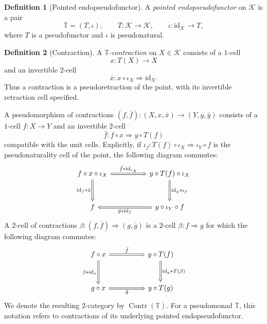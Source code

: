 \documentclass[11pt,a4paper]{article}
\numberwithin{equation}{section}
\theoremstyle{definition}
\newtheorem{definition}[definition]{Definition}
\theoremstyle{remark}
\newcommand{\id}{\mathrm{id}}
\newcommand{\Kcat}{\mathcal K}
\newcommand{\Contr}{\operatorname{Contr}}
\begin{document}
\begin{definition}[Pointed endopseudofunctor]
\label{def:pointed-endopseudofunctor}
A \emph{pointed endopseudofunctor} on $\Kcat$ is a pair
\[
  \mathbb T=(T,\iota),
  \qquad
  T\colon\Kcat\to\Kcat,
  \qquad
  \iota\colon\id_{\Kcat}\to T,
\]
where $T$ is a pseudofunctor and $\iota$ is pseudonatural.
\end{definition}

\begin{definition}[Contraction]
\label{def:contraction}
A \emph{$\mathbb T$-contraction} on $X\in\Kcat$ consists of a $1$-cell
\[
  x\colon T(X)\longrightarrow X
\]
and an invertible $2$-cell
\begin{equation}
  \bar x\colon x\circ\iota_X\Longrightarrow\id_X.
  \label{eq:contraction-unit}
\end{equation}
Thus a contraction is a pseudoretraction of the point, with its
invertible retraction cell specified.
\end{definition}

A pseudomorphism of contractions
$(f,\bar f)\colon(X,x,\bar x)\to(Y,y,\bar y)$ consists of a $1$-cell
$f\colon X\to Y$ and an invertible $2$-cell
\[
  \bar f\colon f\circ x\Longrightarrow y\circ T(f)
\]
compatible with the unit cells. Explicitly, if
$\iota_f\colon T(f)\circ\iota_X\Rightarrow\iota_Y\circ f$ is the
pseudonaturality cell of the point, the following diagram commutes:
\[
\begin{tikzcd}[column sep=5.0em,row sep=3.0em]
  f\circ x\circ\iota_X
    \ar[r,Rightarrow,"\bar f\ast\id_{\iota_X}"]
    \ar[d,Rightarrow,"\id_f\ast\bar x"']
  & y\circ T(f)\circ\iota_X
    \ar[d,Rightarrow,"\id_y\ast\iota_f"]
  \\
  f
  & y\circ\iota_Y\circ f
    \ar[l,Rightarrow,"\bar y\ast\id_f"]
\end{tikzcd}
\]
A $2$-cell of contractions
$\beta\colon(f,\bar f)\Rightarrow(g,\bar g)$ is a $2$-cell
$\beta\colon f\Rightarrow g$ for which the following diagram commutes:
\[
\begin{tikzcd}[column sep=5.0em,row sep=3.0em]
  f\circ x
    \ar[r,Rightarrow,"\bar f"]
    \ar[d,Rightarrow,"\beta\ast\id_x"']
  & y\circ T(f)
    \ar[d,Rightarrow,"\id_y\ast T(\beta)"]
  \\
  g\circ x \ar[r,Rightarrow,"\bar g"']
  & y\circ T(g)
\end{tikzcd}
\]
We denote the resulting $2$-category by $\Contr(\mathbb T)$.
For a pseudomonad $\mathbb T$, this notation refers to contractions
of its underlying pointed endopseudofunctor.
\end{document}
